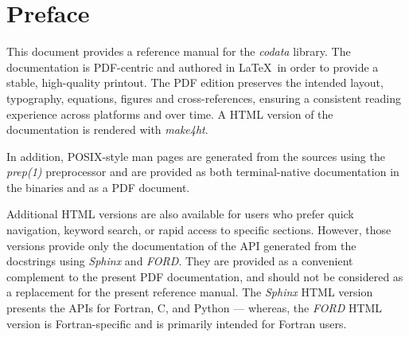 \chapter{Preface}
This document provides a reference manual for the \emph{codata} library.
The documentation is PDF-centric and authored in \LaTeX\ in order to provide 
a stable, high-quality printout.
The PDF edition preserves the intended layout, typography, equations, figures
and cross-references, ensuring a consistent reading experience across 
platforms and over time.
A HTML version of the documentation is rendered with \emph{make4ht}.

In addition, POSIX-style man pages are generated from the sources using 
the \emph{prep(1)} preprocessor and are provided as both terminal-native
documentation in the binaries and as a PDF document.

Additional HTML versions are also available for users who prefer quick
navigation, keyword search, or rapid access to specific sections. 
However, those versions provide only the  documentation of the API generated 
from the docstrings using \emph{Sphinx} and \emph{FORD}. 
They are provided as a convenient complement to the present PDF 
documentation, and should not be considered as a replacement for the 
present reference manual. 
The \emph{Sphinx} HTML version presents the APIs for Fortran, C, and Python 
--- whereas, the \emph{FORD} HTML version is Fortran-specific and is primarily
intended for Fortran users.

\begin{figure}
\end{figure}


